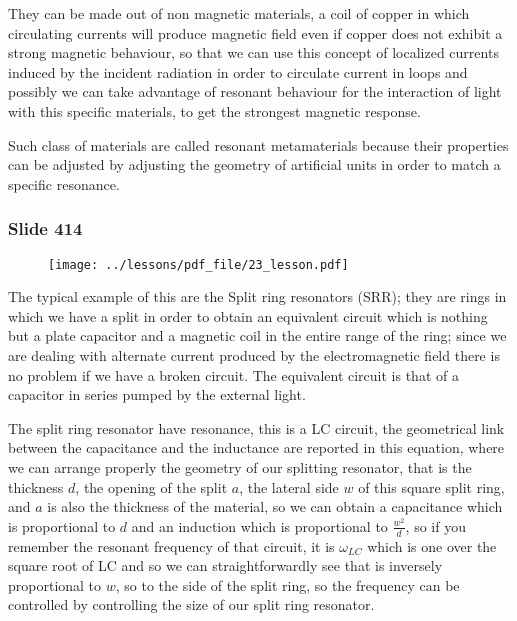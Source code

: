 \documentclass[../main/main.tex]{subfiles}
\begin{document}
They can be made out of non magnetic materials, a coil of copper in which circulating currents will produce magnetic field even if copper does not exhibit a strong magnetic behaviour, so that we can use this concept of localized currents induced by the incident radiation in order to circulate current in loops and possibly we can take advantage of resonant behaviour for the interaction of light with this specific materials, to get the strongest magnetic response.

Such class of materials are called resonant metamaterials because their properties can be adjusted by adjusting the geometry of artificial units in order to match a specific resonance.

\newpage

\subsubsection{Slide 414}

\begin{figure}[h!]
\centering
\texttt{[image: ../lessons/pdf\_file/23\_lesson.pdf]}
\end{figure}

The typical example of this are the Split ring resonators (SRR); they are rings in which we have a split in order to obtain an equivalent circuit which is nothing but a plate capacitor and a magnetic coil in the entire range of the ring; since we are dealing with alternate current produced by the electromagnetic field there is no problem if we have a broken circuit. The equivalent circuit is that of a capacitor in series pumped by the external light.

The split ring resonator have resonance, this is a LC circuit, the geometrical link between the capacitance and the inductance are reported in this equation, where we can arrange properly the geometry of our splitting resonator, that is the thickness $d$, the opening of the split $a$, the lateral side $w$ of this square split ring, and $a$ is also the thickness of the material, so we can obtain a capacitance which is proportional to $d$ and an induction which is proportional to $\frac{w^2}{d}$, so if you remember the resonant frequency of that circuit, it is $\omega_{LC}$ which is one over the square root of LC and so we can straightforwardly see that is inversely proportional to $w$, so to the side of the split ring, so the frequency can be controlled by controlling the size of our split ring resonator.
\end{document}
